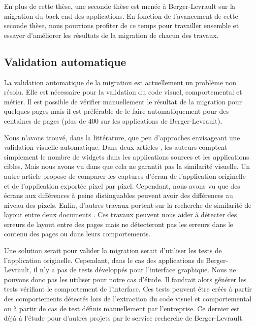 \documentclass[a4paper]{article}
\begin{document}
En plus de cette thèse, une seconde thèse est menée à Berger-Levrault 
  sur la migration du back-end des applications.
En fonction de l'avancement de cette seconde thèse, 
  nous pourrions profiter de ce temps pour travailler ensemble 
  et essayer d'améliorer les résultats de la migration de chacun des travaux.

\subsection{Validation automatique}
\label{sec:validationAutomatique}

La validation automatique de la migration est actuellement un problème non résolu.
Elle est nécessaire pour la validation du code visuel, comportemental et métier.
Il est possible de vérifier manuellement le résultat de la migration pour quelques pages 
  mais il est préférable de le faire automatiquement pour des centaines de pages (plus de 400 sur les applications de Berger-Levrault).

Nous n'avons trouvé, dans la littérature, que peu d'approches envisageant une validation visuelle automatique.
Dans deux articles \citep{Sanc14a,Joor12a}, les auteurs comptent simplement le nombre de widgets dans les applications sources et les applications cibles.
Mais nous avons vu dans  que cela ne garantit pas la similarité visuelle.
Un autre article \citep{Mora18a} propose de comparer les captures d'écran de l'application originelle et de l'application exportée pixel par pixel.
Cependant, nous avons vu  que des écrans aux différences à peine distinguables peuvent avoir des différences au niveau des pixels.
Enfin, d'autres travaux portent sur la recherche de similarité de layout entre deux documents \citep{Cao10a,Hu99a,Egli03a}.
Ces travaux peuvent nous aider à détecter des erreurs de layout entre des pages mais ne détecteront pas les erreurs dans le contenu des pages ou dans leurs comportements. 


Une solution serait pour valider la migration serait d'utiliser les tests de l'application originelle.
Cependant, dans le cas des applications de Berger-Levrault, il n'y a pas de tests développés pour l'interface graphique.
Nous ne pouvons donc pas les utiliser pour notre cas d'étude.
Il faudrait alors générer les tests vérifiant le comportement de l'interface.
Ces tests peuvent être créés à partir des comportements détectés lors de l'extraction du code visuel et comportemental ou
   à partir de cas de test définis manuellement par l'entreprise.
 Ce dernier est déjà à l'étude pour d'autres projets par le service recherche de Berger-Levrault.
\end{document}
